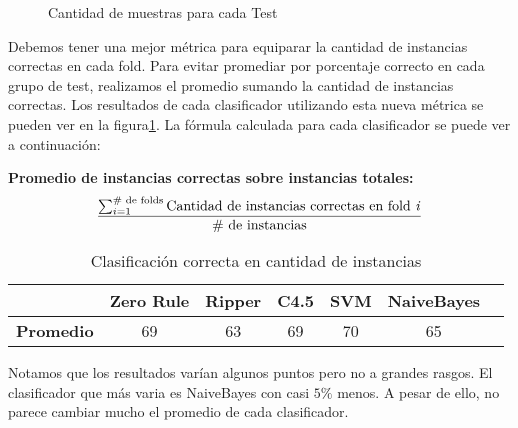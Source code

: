 \begin{figure}[H]
	\centering
	\caption{Cantidad de muestras para cada Test}
	\label{CantDeMuestrasXcadaTest}
\end{figure}

Debemos tener una mejor métrica para equiparar la cantidad de instancias correctas en cada fold. Para evitar promediar por porcentaje correcto en cada grupo de test, realizamos el promedio sumando la cantidad de instancias correctas. Los resultados de cada clasificador utilizando esta nueva métrica se pueden ver en la figura\ref{HPTDT_clas_xval_porHab}. La fórmula calculada para cada clasificador se puede ver a continuación:

\textbf{Promedio de instancias correctas sobre instancias totales:}
\small
\[
{ \sum_{i=1}^{\text{\# de folds}} \text{Cantidad de instancias correctas en fold \textit{i}}
	\over
	\text{\# de instancias}
}
\]

{\small 	
\begin{table}[H]
	\centering
	\begin{tabular}{|l|c|c|c|c|c|c|}
		\hline
		\textbf{}  & \textbf{Zero Rule} & \textbf{Ripper} & \textbf{C4.5} & \textbf{SVM} & \textbf{NaiveBayes} \\ \hline
		\textbf{Promedio} & 69  & 63 & 69 & 70 & 65 \\ \hline
	\end{tabular}
	\caption{Clasificación correcta en cantidad de instancias}
	\label{HPTDT_clas_xval_porHab}
\end{table}}

Notamos que los resultados varían algunos puntos pero no a grandes rasgos. El clasificador que más varia es NaiveBayes con casi $5\%$ menos. A pesar de ello, no parece cambiar mucho el promedio de cada clasificador.
	



